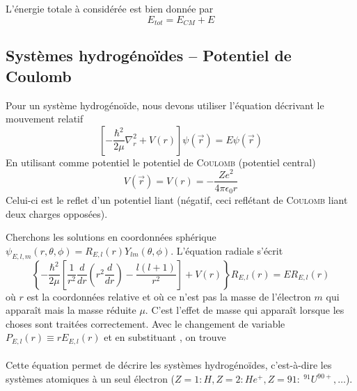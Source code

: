 L'énergie totale à considérée est bien donnée par
\begin{equation}
E_{tot} = E_{CM}+E
\end{equation}


\subsection{Systèmes hydrogénoïdes – Potentiel de Coulomb}
Pour un système hydrogénoïde, nous devons utiliser l'équation décrivant le mouvement relatif
\begin{equation}
\left[-\frac{\hbar^2}{2\mu}\nabla_r^2+V(r)\right]\psi(\vec{r}) = E\psi(\vec{r})
\end{equation}
En utilisant comme potentiel le potentiel de \textsc{Coulomb} (potentiel central)
\begin{equation}
V(\vec{r}) = V(r) = -\dfrac{Ze^2}{4\pi\epsilon_0r}
\end{equation}
Celui-ci est le reflet d'un potentiel liant (négatif, ceci reflétant de \textsc{Coulomb} liant deux charges
opposées).

Cherchons les solutions en coordonnées sphérique $\psi_{E,l,m}(r,\theta,\phi) = R_{E,l}(r)Y_{lm}(\theta,\phi)$. 
L'équation radiale s'écrit
\begin{equation}
\left\{-\frac{\hbar^2}{2\mu}\left[\frac{1}{r^2}\frac{d}{dr}\left(r^2\frac{d}{dr}\right) - \frac{l(l+1)}{r^2}\right]+
V(r)\right\}R_{E,l}(r) = ER_{E,l}(r)
\end{equation}
où $r$ est la coordonnées relative et où ce n'est pas la masse de l'électron $m$ qui apparaît mais la masse
réduite $\mu$. C'est l'effet de masse qui apparaît lorsque les choses sont traitées correctement. Avec le 
changement de variable $P_{E,l}(r) \equiv rE_{E,l}(r)$ et en substituant , on trouve\\

\ \\

Cette équation permet de décrire les systèmes hydrogénoïdes, c'est-à-dire les systèmes atomiques à un seul
électron ($Z=1 : H, Z=2 : He^+, Z=91 :\  ^{91}U^{90+}, \dots$).\\


